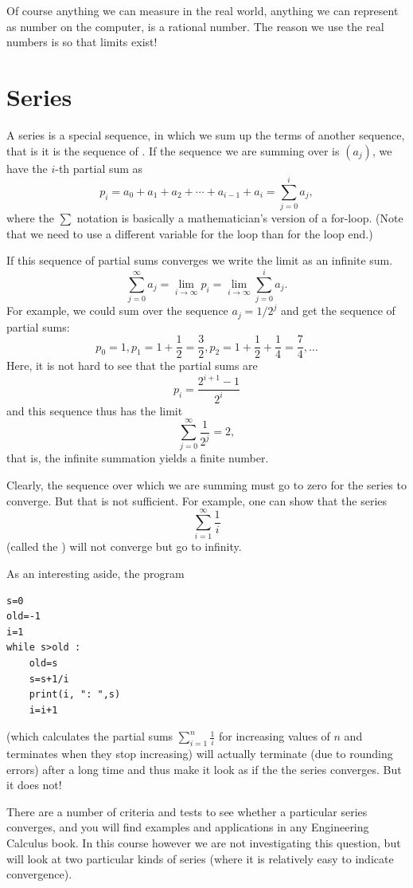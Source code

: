 Of course anything we can measure in the real world, anything we can represent as number
on the computer, is a rational number. The reason we use the real numbers is so that
limits exist!

\section{Series}

A series is a special sequence, in which we sum up the terms of another
sequence, that is it is the sequence of .  If the
sequence we are summing over is $(a_j)$, we have the $i$-th partial sum as
\[
p_i=a_0+a_1+a_2+\cdots+a_{i-1}+a_i=\sum_{j=0}^i a_j,
\]
where the $\sum$ notation is basically a mathematician's version of a for-loop.
(Note that we need to use a different variable for the loop than for the loop end.)

If this sequence of partial sums converges we write the limit as an infinite sum.
\[
\sum_{j=0}^\infty a_j=\lim_{i\to\infty} p_i=\lim_{i\to\infty} \sum_{j=0}^i a_j.
\]
For example, we could sum over the
sequence $a_j=1/2^j$ and get the sequence of partial sums:
\[
p_0=1,
p_1=1+\frac{1}{2}=\frac{3}{2}, 
p_2=1+\frac{1}{2}+\frac{1}{4}=\frac{7}{4}, \ldots
\]
Here, it is not hard to see that the partial sums are
\[
p_i=\frac{2^{i+1}-1}{2^i}
\]
and this sequence thus has the limit
\[
\sum_{j=0}^\infty \frac{1}{2^j}=2,
\]
that is, the infinite summation yields a finite number.
\smallskip

Clearly, the sequence over which we are summing must go to zero for the series to
converge. But that is not sufficient. For example, one can show that the series
\[
\sum_{i=1}^\infty \frac{1}{i}
\]
(called the ) will not converge but go to infinity.

As an interesting aside, the program
\begin{verbatim}
s=0
old=-1
i=1
while s>old :
    old=s
    s=s+1/i
    print(i, ": ",s)
    i=i+1
\end{verbatim}
(which calculates the partial sums $\sum_{i=1}^n \frac{1}{i}$ for increasing
values of $n$ and terminates when they stop increasing) will
actually terminate (due to rounding errors) after a long time and thus
make it look as if the the series converges. But it does not!
\medskip

There are a number of criteria and tests to see whether a particular series converges,
and you will find examples and applications in any Engineering Calculus book. In this
course however we are not investigating this question, but will look at two particular
kinds of series (where it is relatively easy to indicate convergence).

